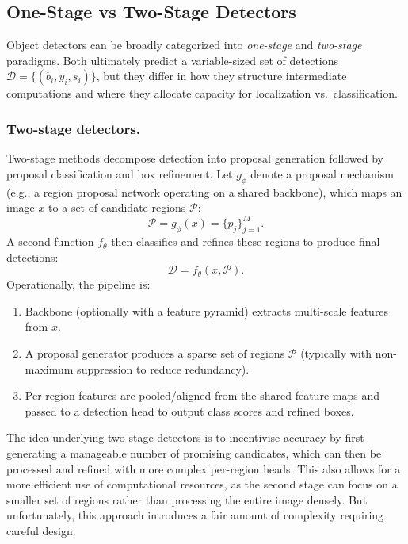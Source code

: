 

\subsection{One-Stage vs Two-Stage Detectors}

Object detectors can be broadly categorized into \emph{one-stage} and \emph{two-stage} paradigms. Both ultimately predict a variable-sized set of detections $\mathcal{D} = \{(b_i, y_i, s_i)\}$, but they differ in how they structure intermediate computations and where they allocate capacity for localization vs.\ classification.

\subsubsection{Two-stage detectors.}
Two-stage methods decompose detection into proposal generation followed by proposal classification and box refinement. Let $g_{\phi}$ denote a proposal mechanism (e.g., a region proposal network operating on a shared backbone), which maps an image $x$ to a set of candidate regions $\mathcal{P}$:
$$
\mathcal{P} = g_{\phi}(x) = \{p_j\}_{j=1}^{M}.
$$
A second function $f_{\theta}$ then classifies and refines these regions to produce final detections:
$$
\mathcal{D} = f_{\theta}(x, \mathcal{P}).
$$
Operationally, the pipeline is:
\begin{enumerate}
    \item Backbone (optionally with a feature pyramid) extracts multi-scale features from $x$.
    \item A proposal generator produces a sparse set of regions $\mathcal{P}$ (typically with non-maximum suppression to reduce redundancy).
    \item Per-region features are pooled/aligned from the shared feature maps and passed to a detection head to output class scores and refined boxes.
\end{enumerate}

The idea underlying two-stage detectors is to incentivise accuracy by first generating a manageable number of promising candidates, which can then be processed and refined with more complex per-region heads. This also allows for a more efficient use of computational resources, as the second stage can focus on a smaller set of regions rather than processing the entire image densely.
But unfortunately, this approach introduces a fair amount of complexity requiring careful design.

